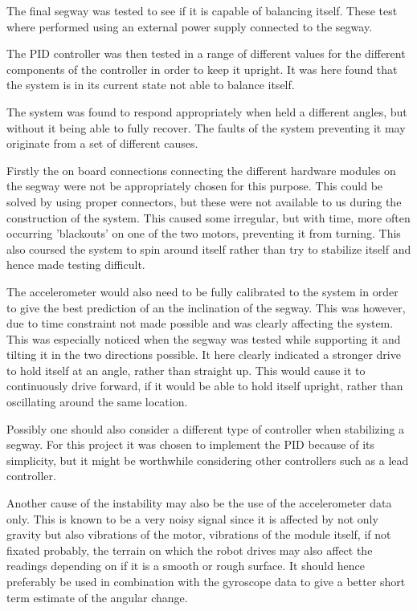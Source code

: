 The final segway was tested to see if it is capable of balancing itself.
These test where performed using an external power supply connected to the segway.

The PID controller was then tested in a range of different values for the different components of the controller in order to keep it upright.
It was here found that the system is in its current state not able to balance itself.

The system was found to respond appropriately when held a different angles, but without it being able to fully recover.
The faults of the system preventing it may originate from a set of different causes.

Firstly the on board connections connecting the different hardware modules on the segway were not be appropriately chosen for this purpose.
This could be solved by using proper connectors, but these were not available to us during the construction of the system.
This caused some irregular, but with time, more often occurring 'blackouts' on one of the two motors, preventing it from turning.
This also coursed the system to spin around itself rather than try to stabilize itself and hence made testing difficult.

The accelerometer would also need to be fully calibrated to the system in order to give the best prediction of an the inclination of the segway.
This was however, due to time constraint not made possible and was clearly affecting the system.
This was especially noticed when the segway was tested while supporting it and tilting it in the two directions possible.
It here clearly indicated a stronger drive to hold itself at an angle, rather than straight up.
This would cause it to continuously drive forward, if it would be able to hold itself upright, rather than oscillating around the same location.

Possibly one should also consider a different type of controller when stabilizing a segway.
For this project it was chosen to implement the PID because of its simplicity, but it might be worthwhile considering other controllers such as a lead controller.

Another cause of the instability may also be the use of the accelerometer data only.
This is known to be a very noisy signal since it is affected by not only gravity but also vibrations of the motor, vibrations of the module itself, if not fixated probably, the terrain on which the robot drives may also affect the readings depending on if it is a smooth or rough surface.
It should hence preferably be used in combination with the gyroscope data to give a better short term estimate of the angular change.